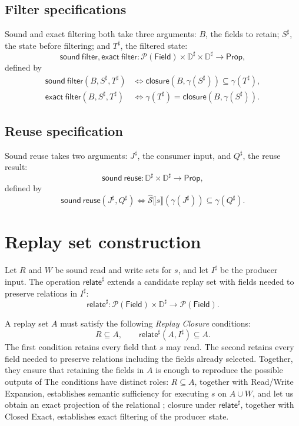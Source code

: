\documentclass[10pt]{article}
\newcommand{\Field}{\mathsf{Field}}
\newcommand{\CollectingSemantics}[1]{\widehat{\mathcal S}\mathopen{⟦}#1\mathclose{⟧}}
\newcommand{\ProjClose}{\mathsf{closure}}
\newcommand{\relate}{\mathsf{relate}}
\newcommand{\SoundFilter}{\mathsf{sound\ filter}}
\newcommand{\ExactFilter}{\mathsf{exact\ filter}}
\newcommand{\SoundReuse}{\mathsf{sound\ reuse}}
\providecommand{\DIFaddtex}[1]{{\protect\color{blue} #1}} %
\providecommand{\DIFdeltex}[1]{{\protect\color{red} \scriptsize #1}} %
\providecommand{\DIFaddbegin}{} %
\providecommand{\DIFaddend}{} %
\providecommand{\DIFdelbegin}{} %
\providecommand{\DIFdelend}{} %
\providecommand{\DIFadd}[1]{\texorpdfstring{\DIFaddtex{#1}}{#1}} %
\providecommand{\DIFdel}[1]{\texorpdfstring{\DIFdeltex{#1}}{}} %
\begin{document}
\subsection{Filter specifications}

Sound and exact filtering both take three arguments: \(B\), the fields to retain;
\(S^\sharp\), the state before filtering; and \(T^\sharp\), the filtered state:
\[
  \SoundFilter,\ExactFilter:
  \mathcal P(\Field)\times\mathbb D^\sharp\times\mathbb D^\sharp
  \to\mathsf{Prop},
\]
defined by
\begin{align*}
  \SoundFilter(B,S^\sharp,T^\sharp)
  &\Longleftrightarrow
  \ProjClose\!\left(B,\gamma(S^\sharp)\right)\subseteq\gamma(T^\sharp),\\
  \ExactFilter(B,S^\sharp,T^\sharp)
  &\Longleftrightarrow
  \gamma(T^\sharp)=\ProjClose\!\left(B,\gamma(S^\sharp)\right).
\end{align*}
\subsection{Reuse specification}

Sound reuse takes two arguments: \(J^\sharp\), the consumer input, and \(Q^\sharp\), the
reuse result:
\[
  \SoundReuse:\mathbb D^\sharp\times\mathbb D^\sharp\to\mathsf{Prop},
\]
defined by
\[
  \SoundReuse(J^\sharp,Q^\sharp)
  \Longleftrightarrow
  \CollectingSemantics{s}\!\left(\gamma(J^\sharp)\right)
  \subseteq\gamma(Q^\sharp).
  \tag{SR}
\]

\section{Replay set construction}

Let \(R\) and \(W\) be sound read and write sets for \(s\), and let \(I^\sharp\) be the
producer input. The operation \(\relate^\sharp\) extends a candidate replay set with fields
needed to preserve relations in \(I^\sharp\):
\[
  \relate^\sharp:
  \mathcal P(\Field)\times\mathbb D^\sharp\to\mathcal P(\Field).
\]

A replay set \(A\) must satisfy the following \emph{Replay Closure} conditions:
\[
  R\subseteq A,
  \qquad
  \relate^\sharp(A,I^\sharp)\subseteq A.
  \tag{Replay Closure}
\]
The first condition retains every field that \(s\) may read. The second retains every field
needed to preserve relations including the fields already selected. \DIFdelbegin \DIFdel{Together, they ensure that
retaining the fields in \(A\) is enough to reproduce the possible outputs of }\DIFdelend \DIFaddbegin \DIFadd{The conditions have distinct
roles: \(R\subseteq A\), together with Read/Write Expansion, establishes semantic sufficiency for
executing }\DIFaddend \(s\)\DIFdelbegin \DIFdel{on \(A\cup W\), and let us obtain an exact
projection of the relational }\DIFdelend \DIFaddbegin \DIFadd{; closure under \(\relate^\sharp\), together with Closed Exact, establishes exact
filtering of the }\DIFaddend producer state.
\end{document}
